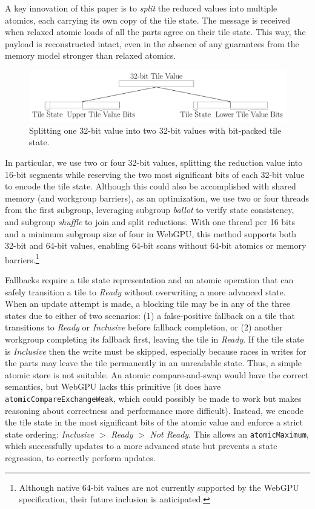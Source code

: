 \documentclass[sigconf]{acmart}
\begin{document}
A key innovation of this paper is to \emph{split} the reduced values into multiple atomics, each carrying its own copy of the tile state. The message is received when relaxed atomic loads of all the parts agree on their tile state. This way, the payload is reconstructed intact, even in the absence of any guarantees from the memory model stronger than relaxed atomics.

\begin{figure}[h!]
  \centering
  \includegraphics[width=\linewidth]{graphics/split.pdf}
  \caption{Splitting one 32-bit value into two 32-bit values with bit-packed tile state.}
\end{figure}

In particular, we use two or four 32-bit values, splitting the reduction value into 16-bit segments while reserving the two most significant bits of each 32-bit value to encode the tile state. Although this could also be accomplished with shared memory (and workgroup barriers), as an optimization, we use two or four threads from the first subgroup, leveraging subgroup \emph{ballot} to verify state consistency, and subgroup \emph{shuffle} to join and split reductions. With one thread per 16 bits and a minimum subgroup size of four in WebGPU, this method supports both 32-bit and 64-bit values, enabling 64-bit scans without 64-bit atomics or memory barriers.\footnote{Although native 64-bit values are not currently supported by the WebGPU specification, their future inclusion is anticipated.}

Fallbacks require a tile state representation and an atomic operation that can safely transition a tile to \emph{Ready} without overwriting a more advanced state. When an update attempt is made, a blocking tile may be in any of the three states due to either of two scenarios: (1) a false-positive fallback on a tile that transitions to \emph{Ready} or \emph{Inclusive} before fallback completion, or (2) another workgroup completing its fallback first, leaving the tile in \emph{Ready}. If the tile state is \emph{Inclusive} then the write must be skipped, especially because races in writes for the parts may leave the tile permanently in an unreadable state. Thus, a simple atomic store is not suitable. An atomic compare-and-swap would have the correct semantics, but WebGPU lacks this primitive (it does have \texttt{atomicCompareExchangeWeak}, which could possibly be made to work but makes reasoning about correctness and performance more difficult). Instead, we encode the tile state in the most significant bits of the atomic value and enforce a strict state ordering: \emph{Inclusive} $>$ \emph{Ready} $>$ \emph{Not Ready}. This allows an \texttt{atomicMaximum}, which successfully updates to a more advanced state but prevents a state regression, to correctly perform updates.
\end{document}

